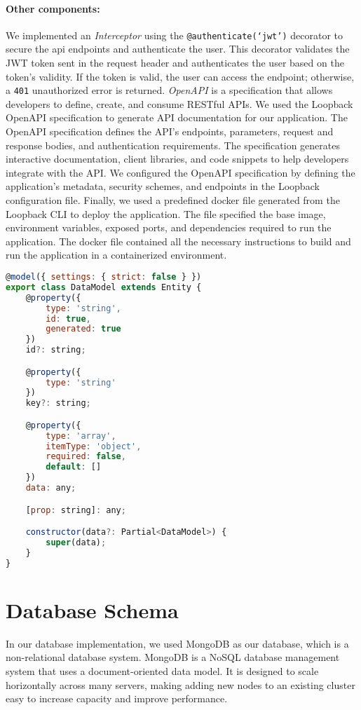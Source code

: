 \paragraph{Other components:}
We implemented an \textit{Interceptor} using the \texttt{@authenticate(`jwt')} decorator to secure the \ac{api} endpoints and authenticate the user. 
This decorator validates the JWT token sent in the request header and authenticates the user based on the token's validity. 
If the token is valid, the user can access the endpoint; otherwise, a \texttt{401} unauthorized error is returned.
\textit{OpenAPI} is a specification that allows developers to define, create, and consume RESTful APIs. 
We used the Loopback OpenAPI specification to generate API documentation for our application. 
The OpenAPI specification defines the API's endpoints, parameters, request and response bodies, and authentication requirements. 
The specification generates interactive documentation, client libraries, and code snippets to help developers integrate with the API. 
We configured the OpenAPI specification by defining the application's metadata, security schemes, and endpoints in the Loopback configuration file.
Finally, we used a predefined docker file generated from the Loopback CLI to deploy the application. 
The file specified the base image, environment variables, exposed ports, and dependencies required to run the application. 
The docker file contained all the necessary instructions to build and run the application in a containerized environment.

\begin{lstlisting}[language=JavaScript, caption=The Typescript File for the Data Model, label=listing:implementation:datamodel]
@model({ settings: { strict: false } })
export class DataModel extends Entity {
    @property({
        type: 'string',
        id: true,
        generated: true
    })
    id?: string;

    @property({
        type: 'string'
    })
    key?: string;

    @property({
        type: 'array',
        itemType: 'object',
        required: false,
        default: []
    })
    data: any;

    [prop: string]: any;

    constructor(data?: Partial<DataModel>) {
        super(data);
    }
}
\end{lstlisting}
\clearpage

\section{Database Schema}
\label{implementation:section:database}
In our database implementation, we used MongoDB as our database, which is a non-relational database system. 
MongoDB is a NoSQL database management system that uses a document-oriented data model. It is designed to scale horizontally across many servers, making adding new nodes to an existing cluster easy to increase capacity and improve performance.

